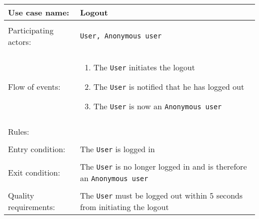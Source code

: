 \documentclass[../report.tex]{subfiles}
\begin{document}
\noindent
\begin{tabular}{ l p{8cm} }                    
 Use case name:  & Logout   \\   \hline \\               
 Participating actors:  & \texttt{User, Anonymous user} \\   \hline \\         
 Flow of events: & \begin{enumerate}
\item{The \texttt{User} initiates the logout}
\item{The \texttt{User} is notified that he has logged out}
\item{The \texttt{User} is now an \texttt{Anonymous user}}
\end{enumerate}
 \\   \hline \\
Rules: & \\ \hline \\
Entry condition: & The \texttt{User} is logged in \\ \hline \\
Exit condition: & The \texttt{User} is no longer logged in and is therefore an \texttt{Anonymous user} \\ \hline \\
Quality requirements: & The \texttt{User} must be logged out within 5 seconds from initiating the logout \\ \hline             
\end{tabular} \\
\\ \\ \\
\end{document}
